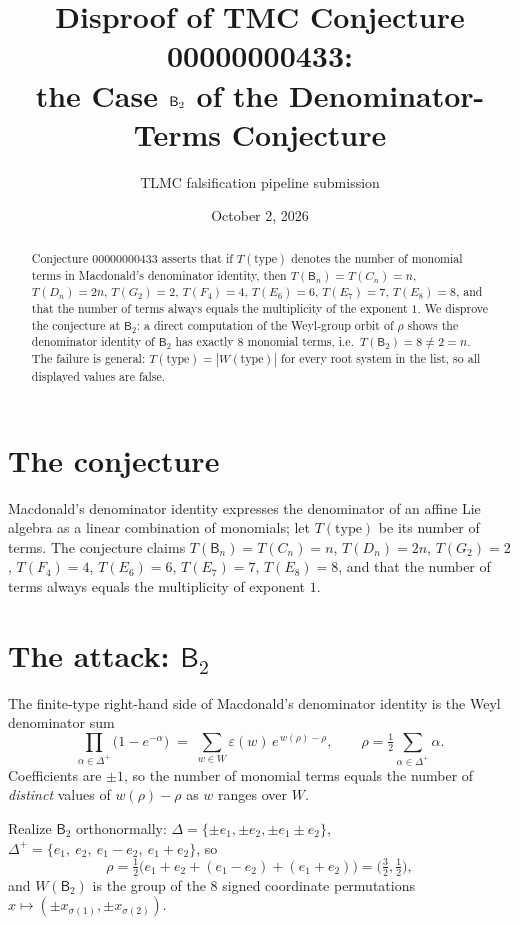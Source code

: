 \documentclass[11pt]{article}
\title{Disproof of TMC Conjecture 00000000433:\\
the Case $\BB_2$ of the Denominator-Terms Conjecture}
\author{TLMC falsification pipeline submission}
\date{October 2, 2026}
\newcommand{\BB}{\mathsf{B}}
\newcommand{\WW}{W}
\begin{document}
\maketitle

\begin{abstract}
Conjecture 00000000433 asserts that if $T(\mathrm{type})$ denotes the number
of monomial terms in Macdonald's denominator identity, then
$T(\BB_n)=T(C_n)=n$, $T(D_n)=2n$, $T(G_2)=2$, $T(F_4)=4$, $T(E_6)=6$,
$T(E_7)=7$, $T(E_8)=8$, and that the number of terms always equals the
multiplicity of the exponent $1$. We disprove the conjecture at $\BB_2$:
a direct computation of the Weyl-group orbit of $\rho$ shows the denominator
identity of $\BB_2$ has exactly $8$ monomial terms, i.e.\ $T(\BB_2)=8\neq 2=n$.
The failure is general: $T(\mathrm{type})=|\WW(\mathrm{type})|$ for every
root system in the list, so all displayed values are false.
\end{abstract}

\section{The conjecture}

Macdonald's denominator identity expresses the denominator of an affine Lie
algebra as a linear combination of monomials; let $T(\mathrm{type})$ be its
number of terms. The conjecture claims $T(\BB_n)=T(C_n)=n$, $T(D_n)=2n$,
$T(G_2)=2$, $T(F_4)=4$, $T(E_6)=6$, $T(E_7)=7$, $T(E_8)=8$, and that the
number of terms always equals the multiplicity of exponent $1$.

\section{The attack: $\BB_2$}

The finite-type right-hand side of Macdonald's denominator identity is the
Weyl denominator sum
\[
\prod_{\alpha\in\Delta^+}\bigl(1-e^{-\alpha}\bigr)
 \;=\; \sum_{w\in\WW}\varepsilon(w)\,e^{\,w(\rho)-\rho},
\qquad
\rho=\tfrac12\sum_{\alpha\in\Delta^+}\alpha .
\]
Coefficients are $\pm1$, so the number of monomial terms equals the number of
\emph{distinct} values of $w(\rho)-\rho$ as $w$ ranges over $\WW$.

Realize $\BB_2$ orthonormally: $\Delta=\{\pm e_1,\pm e_2,\pm e_1\pm e_2\}$,
$\Delta^+=\{e_1,\ e_2,\ e_1-e_2,\ e_1+e_2\}$, so
\[
\rho=\tfrac12\bigl(e_1+e_2+(e_1-e_2)+(e_1+e_2)\bigr)=\bigl(\tfrac32,\tfrac12\bigr),
\]
and $\WW(\BB_2)$ is the group of the $8$ signed coordinate permutations
$x\mapsto(\pm x_{\sigma(1)},\pm x_{\sigma(2)})$.
\end{document}
